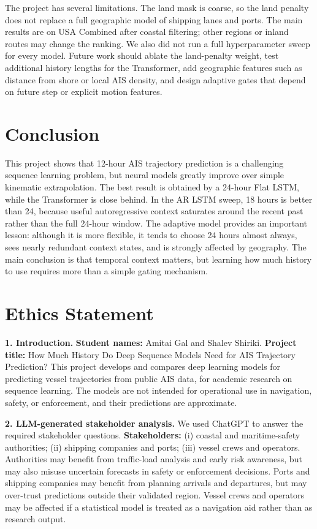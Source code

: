 The project has several limitations. The land mask is coarse, so the land penalty does not replace a full geographic model of shipping lanes and ports. The main results are on USA Combined after coastal filtering; other regions or inland routes may change the ranking. We also did not run a full hyperparameter sweep for every model. Future work should ablate the land-penalty weight, test additional history lengths for the Transformer, add geographic features such as distance from shore or local AIS density, and design adaptive gates that depend on future step or explicit motion features.

\section{Conclusion}
This project shows that 12-hour AIS trajectory prediction is a challenging sequence learning problem, but neural models greatly improve over simple kinematic extrapolation. The best result is obtained by a 24-hour Flat LSTM, while the Transformer is close behind. In the AR LSTM sweep, 18 hours is better than 24, because useful autoregressive context saturates around the recent past rather than the full 24-hour window. The adaptive model provides an important lesson: although it is more flexible, it tends to choose 24 hours almost always, sees nearly redundant context states, and is strongly affected by geography. The main conclusion is that temporal context matters, but learning how much history to use requires more than a simple gating mechanism.

\section{Ethics Statement}
\textbf{1. Introduction.} \textbf{Student names:} Amitai Gal and Shalev Shiriki. \textbf{Project title:} How Much History Do Deep Sequence Models Need for AIS Trajectory Prediction? This project develops and compares deep learning models for predicting vessel trajectories from public AIS data, for academic research on sequence learning. The models are not intended for operational use in navigation, safety, or enforcement, and their predictions are approximate.

\textbf{2. LLM-generated stakeholder analysis.} We used ChatGPT to answer the required stakeholder questions. \textbf{Stakeholders:} (i) coastal and maritime-safety authorities; (ii) shipping companies and ports; (iii) vessel crews and operators. Authorities may benefit from traffic-load analysis and early risk awareness, but may also misuse uncertain forecasts in safety or enforcement decisions. Ports and shipping companies may benefit from planning arrivals and departures, but may over-trust predictions outside their validated region. Vessel crews and operators may be affected if a statistical model is treated as a navigation aid rather than as research output.

